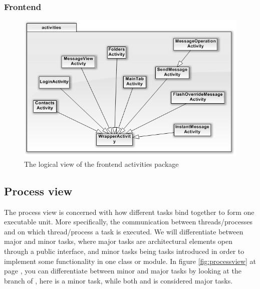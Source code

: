 \subsubsection{Frontend}
	\begin{figure}[H]
		\includegraphics[width=\textwidth]{FrontendClasses.png}
		\caption{The logical view of the frontend activities package}
		\label{fig:logicalfrontpackview}
	\end{figure}	
	
\subsection{Process view}
The process view is concerned with how different tasks bind together to form one executable unit. More specifically, the communication between threads/processes and on which thread/process a task is executed. We will differentiate between major and minor tasks, where major tasks are architectural elements open through a public interface, and minor tasks being tasks introduced in order to implement some functionality in one class or module.
In figure \ref{fig:processview} at page \pageref{fig:processview}, you can differentiate between minor and major tasks by looking at the  branch of , here  is a minor task, while both  and  is considered major tasks. 


